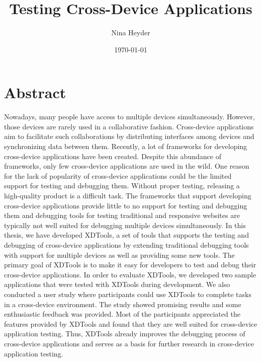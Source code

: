 \documentclass[11pt,a4paper]{globis-book}
\title{Testing Cross-Device Applications}
\author{Nina Heyder}
\institute{Institute of Information Systems}
\date{\today}
\begin{document}
\frontmatter
\maketitlepage
\cleardoublepage
{}

\chapter*{Abstract}

Nowadays, many people have access to multiple devices simultaneously. However, those devices are rarely used in a collaborative fashion. Cross-device applications aim to facilitate such collaborations by distributing interfaces among devices and synchronizing data between them. Recently, a lot of frameworks for developing cross-device applications have been created. Despite this abundance of frameworks, only few cross-device applications are used in the wild. One reason for the lack of popularity of cross-device applications could be the limited support for testing and debugging them. Without proper testing, releasing a high-quality product is a difficult task. The frameworks that support developing cross-device applications provide little to no support for testing and debugging them and debugging tools for testing traditional and responsive websites are typically not well suited for debugging multiple devices simultaneously. In this thesis, we have developed XDTools, a set of tools that supports the testing and debugging of cross-device applications by extending traditional debugging tools with support for multiple devices as well as providing some new tools. The primary goal of XDTools is to make it easy for developers to test and debug their cross-device applications. In order to evaluate XDTools, we developed two sample applications that were tested with XDTools during development. We also conducted a user study where participants could use XDTools to complete tasks in a cross-device environment. The study showed promising results and some enthusiastic feedback was provided. Most of the participants appreciated the features provided by XDTools and found that they are well suited for cross-device application testing. Thus, XDTools already improves the debugging process of cross-device applications and serves as a basis for further research in cross-device application testing.

\tableofcontents

\mainmatter









\end{document}
